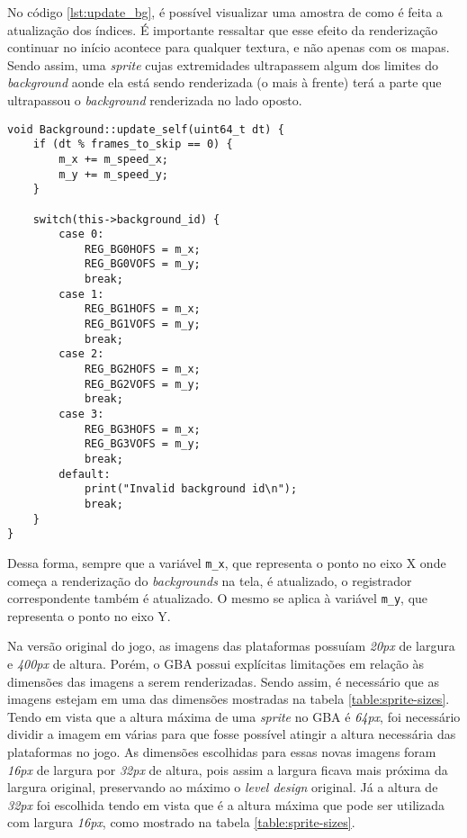 No código \ref{lst:update_bg}, é possível visualizar uma amostra de como é feita a atualização dos índices. É importante ressaltar que esse efeito da renderização continuar no início acontece para qualquer textura, e não apenas com os mapas. Sendo assim, uma \textit{sprite} cujas extremidades ultrapassem algum dos limites do \textit{background} aonde ela está sendo renderizada (o mais à frente) terá a parte que ultrapassou o \textit{background} renderizada no lado oposto.

\begin{lstlisting}[caption={Método responsável por atualizar os índices de renderização do \textit{background}},label={lst:update_bg}]
void Background::update_self(uint64_t dt) {
    if (dt % frames_to_skip == 0) {
        m_x += m_speed_x;
        m_y += m_speed_y;
    }

    switch(this->background_id) {
        case 0:
            REG_BG0HOFS = m_x;
            REG_BG0VOFS = m_y;
            break;
        case 1:
            REG_BG1HOFS = m_x;
            REG_BG1VOFS = m_y;
            break;
        case 2:
            REG_BG2HOFS = m_x;
            REG_BG2VOFS = m_y;
            break;
        case 3:
            REG_BG3HOFS = m_x;
            REG_BG3VOFS = m_y;
            break;
        default:
            print("Invalid background id\n");
            break;
    }
}
\end{lstlisting}

Dessa forma, sempre que a variável \texttt{m\_x}, que representa o ponto no eixo X onde começa a renderização do \textit{backgrounds} na tela, é atualizado, o registrador correspondente também é atualizado. O mesmo se aplica à variável \texttt{m\_y}, que representa o ponto no eixo Y.

Na versão original do jogo, as imagens das plataformas possuíam \textit{20px} de largura e \textit {400px} de altura. Porém, o GBA possui explícitas limitações em relação às dimensões das imagens a serem renderizadas. Sendo assim, é necessário que as imagens estejam em uma das dimensões mostradas na tabela \ref{table:sprite-sizes}. Tendo em vista que a altura máxima de uma \textit{sprite} no GBA é \textit{64px}, foi necessário dividir a imagem em várias para que fosse possível atingir a altura necessária das plataformas no jogo. As dimensões escolhidas para essas novas imagens foram \textit{16px} de largura por \textit{32px} de altura, pois assim a largura ficava mais próxima da largura original, preservando ao máximo o \textit{level design} original. Já a altura de \textit{32px} foi escolhida tendo em vista que é a altura máxima que pode ser utilizada com largura \textit{16px}, como mostrado na tabela \ref{table:sprite-sizes}.

